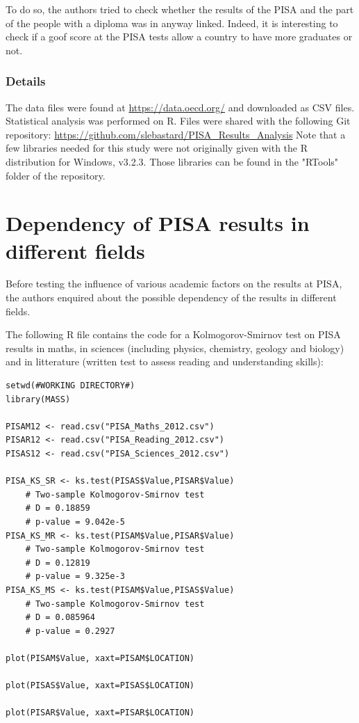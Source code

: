 \documentclass[12pt,a4paper]{article}
\begin{document}
To do so, the authors tried to check whether the results of the PISA and the part of the people with a diploma was in anyway linked. Indeed, it is interesting to check if a goof score at the PISA tests allow a country to have more graduates or not.

\subsubsection{Details}

The data files were found at \url{https://data.oecd.org/} and downloaded as CSV files.
Statistical analysis was performed on R. Files were shared with the following Git repository:
\url{https://github.com/slebastard/PISA\_Results\_Analysis}
Note that a few libraries needed for this study were not originally given with the R distribution for Windows, v3.2.3. Those libraries can be found in the "RTools" folder of the repository.

\section{Dependency of PISA results in different fields}

Before testing the influence of various academic factors on the results at PISA, the authors enquired about the possible dependency of the results in different fields.

The following R file contains the code for a Kolmogorov-Smirnov test on PISA results in maths, in sciences (including physics, chemistry, geology and biology) and in litterature (written test to assess reading and understanding skills):

\begin{lstlisting}
setwd(#WORKING DIRECTORY#)
library(MASS)

PISAM12 <- read.csv("PISA_Maths_2012.csv")
PISAR12 <- read.csv("PISA_Reading_2012.csv")
PISAS12 <- read.csv("PISA_Sciences_2012.csv")

PISA_KS_SR <- ks.test(PISAS$Value,PISAR$Value)
	# Two-sample Kolmogorov-Smirnov test
	# D = 0.18859
	# p-value = 9.042e-5
PISA_KS_MR <- ks.test(PISAM$Value,PISAR$Value)
	# Two-sample Kolmogorov-Smirnov test
	# D = 0.12819
	# p-value = 9.325e-3
PISA_KS_MS <- ks.test(PISAM$Value,PISAS$Value)
	# Two-sample Kolmogorov-Smirnov test
	# D = 0.085964
	# p-value = 0.2927
	
plot(PISAM$Value, xaxt=PISAM$LOCATION)

plot(PISAS$Value, xaxt=PISAS$LOCATION)

plot(PISAR$Value, xaxt=PISAR$LOCATION)
\end{lstlisting}
\end{document}
